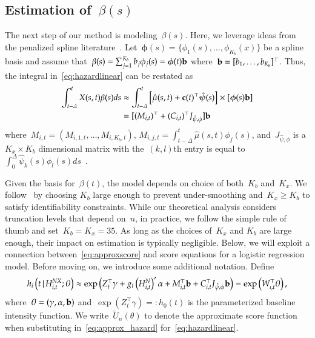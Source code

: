 \documentclass[11pt]{amsart}
\def\given{\, | \,}
\begin{document}
\subsection{Estimation of~$\beta(s)$}
\label{section:beta}

The next step of our method is modeling~$\beta(s)$. Here, we leverage ideas from the penalized spline literature~\citep{Ruppert2003, Wood2006book}. Let~$\mathbold{\phi} (s) = \{ \phi_1 (s), \ldots, \phi_{K_b} (x) \}$ be a spline basis and assume that~$\beta(s) = \sum_{j=1}^{K_b} b_j \phi_{j} (s) = \mathbold{\phi} (t) {\bf b}$ where~${\bf b} = [b_1, \ldots, b_{K_b}]^{\top}$. Thus, the integral in~\eqref{eq:hazardlinear} can be restated as
\begin{align*}
\int_{t-\Delta}^t X(s,t) \beta(s) ds
  &\approx \int_{t-\Delta}^t \left[ \hat \mu(s,t) + {\bf c} (t)^\top
    \mathbold{\hat \psi} (s) \right] \times \left[
    \mathbold{\phi} (s) {\bf b} \right] \\
  &= [ ( M_{i,t} )^\top + (C_{i,t})^\top J_{\hat \psi, \phi} ] {\bf b}
\end{align*}
where~$M_{i,t} = (M_{i,1,t}, \ldots, M_{i,K_b,t})$, $M_{i,j,t} = \int_{t-\Delta}^t \hat \mu (s,t) \phi_j (s)$, and~$J_{\hat \psi, \phi}$ is a $K_x \times K_b$ dimensional matrix with the~$(k,l)$th entry is equal to~$\int_{0}^\Delta \hat \psi_k (s) \phi_l (s) ds$~\citep{RamsaySilverman2005}.

Given the basis for~$\beta(t)$, the model depends on choice of both~$K_b$ and~$K_x$.  We follow~\cite{Ruppert2002} by choosing $K_b$ large enough to prevent under-smoothing and~$K_x \geq K_b$ to satisfy identifiability constraints. While our theoretical analysis considers truncation levels that depend on~$n$, in practice, we follow the simple rule of thumb and set~$K_b = K_x = 35$. As long as the choices of~$K_x$ and $K_b$ are large enough, their impact on estimation is typically negligible. Below, we will exploit a connection between~\eqref{eq:approxscore} and score equations for a logistic regression model.  Before moving on, we introduce some additional notation. Define
\begin{equation}
\label{eq:approx_hazard}
h_i \left( t \given  H_{i,t}^{NX} ; \theta \right) \approx
\exp \left( Z_{t}^\top \gamma + g_t \left( H_{i,t}^{N} \right)^{\prime} \alpha
  + M_{i,t}^\top {\bf b} + C_{i,t}^\top J_{\hat \psi, \phi} {\bf b} \right)
= \exp \left( W_{i,t}^\top \theta \right),
\end{equation}
where~$\theta = (\gamma, \alpha, {\bf b})$ and~$\exp ( Z_{t}^\top \gamma) =: h_0 (t)$ is the parameterized baseline intensity function. We write~$\tilde U_n (\theta)$ to denote the approximate score function when substituting in~\eqref{eq:approx_hazard} for~\eqref{eq:hazardlinear}.
\end{document}
